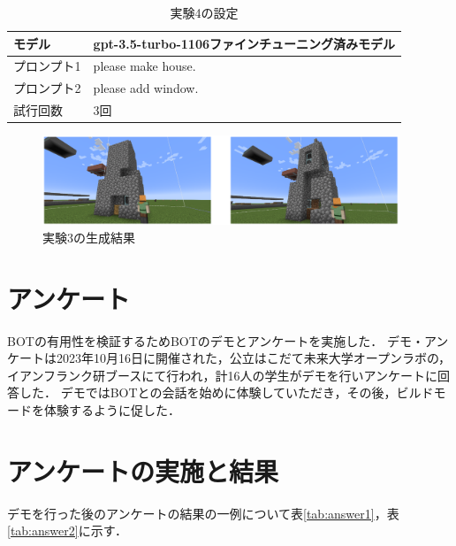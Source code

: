 \begin{table}[H]
    \caption{実験4の設定}\label{tab:setting4}
    \centering
    \begin{tabular}{ll}
        \hline \hline
        モデル & gpt-3.5-turbo-1106ファインチューニング済みモデル \\
        \hline
        プロンプト1 & please make house. \\
        \hline
        プロンプト2 & please add window. \\
        \hline
        試行回数 & 3回 \\
        \hline
    \end{tabular}
\end{table}

\begin{figure}[H]
    \centering
    \includegraphics[width=0.95\textwidth]{fig/add_window2.PNG}
    \caption{実験3の生成結果}
    \label{fig:add_window2}
\end{figure}

\section{アンケート}
BOTの有用性を検証するためBOTのデモとアンケートを実施した．
デモ・アンケートは2023年10月16日に開催された，公立はこだて未来大学オープンラボの，イアンフランク研ブースにて行われ，計16人の学生がデモを行いアンケートに回答した．
デモではBOTとの会話を始めに体験していただき，その後，ビルドモードを体験するように促した．

\section{アンケートの実施と結果}
デモを行った後のアンケートの結果の一例について表\ref{tab:answer1}，表\ref{tab:answer2}に示す．

